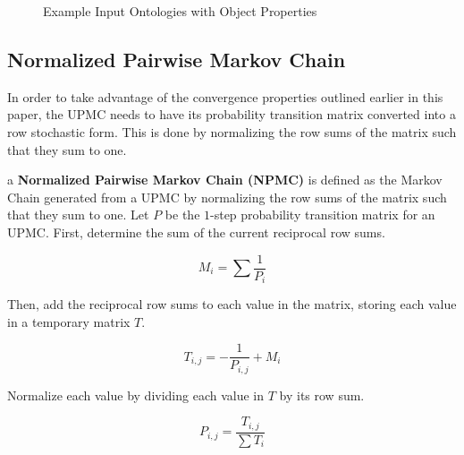 \documentclass[letterpaper,twocolumn,12pt]{article}
\begin{document}
\begin{figure*}
\centering
\SetVertexNormal[
	Shape = circle,
    LineWidth = 1pt
]
\SetUpEdge[
	lw = 1pt,
    color = orange,
    labelcolor = white
]
\caption{Example Input Ontologies with Object Properties}
\label{fig:input}
\end{figure*}

\subsection{Normalized Pairwise Markov Chain}

In order to take advantage of the convergence properties outlined earlier in this paper, the UPMC needs to have its probability transition matrix converted into a row stochastic form. 
This is done by normalizing the row sums of the matrix such that they sum to one.

\begin{defn}
\label{def:npmc}
a {\bf Normalized Pairwise Markov Chain (NPMC)} is defined as the Markov Chain generated from a UPMC by normalizing the row sums of the matrix such that they sum to one. Let $P$ be the $1$-step probability transition matrix for an UPMC. 
First, determine the sum of the current reciprocal row sums.

$$ M_i = \sum \frac{1}{P_i} $$

\noindent Then, add the reciprocal row sums to each value in the matrix, storing each value in a temporary matrix $T$.

$$ T_{i,j} = -\frac{1}{P_{i,j}} + M_i $$

\noindent Normalize each value by dividing each value in $T$ by its row sum.

$$ P_{i,j} = \frac{T_{i,j}}{\sum T_i} $$
\end{defn}
\end{document}
